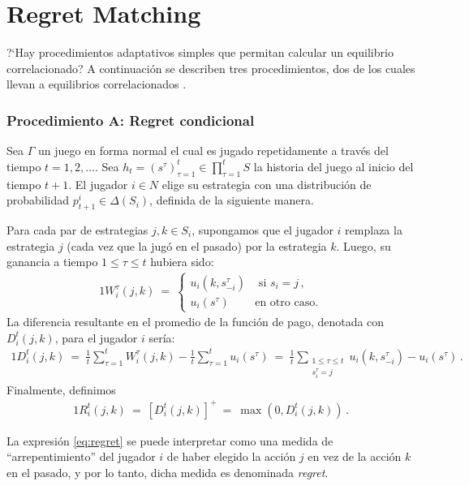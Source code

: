 \chapter{Regret Matching}
?`Hay procedimientos adaptativos simples que permitan calcular un equilibrio correlacionado? A continuación se describen tres procedimientos, dos de los cuales llevan a equilibrios correlacionados \cite{bib:correlated-equilibrium}.

\subsection*{Procedimiento A: Regret condicional}

Sea $\Gamma$ un juego en forma normal el cual es jugado repetidamente a través del tiempo $t = 1, 2, \ldots $. 
Sea $h_t = (s^\tau)_{\tau = 1}^t \in \prod_{\tau = 1}^{t} S$ la historia del juego al inicio del tiempo $t+1$. El jugador $i \in N$ elige su estrategia con una distribución de probabilidad $p_{t+1}^i \in \Delta(S_i)$, definida de la siguiente manera.

Para cada par de estrategias $j, k \in S_i$, supongamos que el jugador $i$ remplaza la estrategia $j$ (cada vez que la jugó en el pasado) por la estrategia $k$. Luego, su ganancia a tiempo $1\leq \tau \leq t$ hubiera sido:
\begin{alignat}{1}
W_i^{\tau}(j,k)\ =\ 
\begin{cases}
u_i(k, s_{-i}^{\tau}) &\text{ si } s_i = j \,, \\
u_i(s^\tau) & \text{en otro caso.} 
\end{cases}
\end{alignat}
La diferencia resultante en el promedio de la función de pago, denotada con $D_i^t(j, k)$, para el jugador $i$ sería:
\begin{alignat}{1}
  D_i^t(j, k)\ 
    =\ \frac{1}{t} \sum_{\tau = 1}^{t} W_i^{\tau}(j, k) - \frac{1}{t} \sum_{\tau = 1}^{t} u_i(s^{\tau})\ 
	=\ \frac{1}{t} \sum_{\substack{1\leq \tau \leq t \\s^\tau_i = j}} u_i(k, s_{-i}^{\tau}) - u_i(s^{\tau}) \,.
\end{alignat}
Finalmente, definimos
\begin{alignat}{1}
\label{eq:regret}
R_i^t(j, k)\ =\ [D_i^t(j, k)]^+\ =\ \max(0, D_i^t(j, k)) \,.
\end{alignat}

La expresión \eqref{eq:regret} se puede interpretar como una medida de ``arrepentimiento'' del jugador $i$ de haber elegido la acción $j$ en vez de la acción $k$ en el pasado, y por lo tanto, dicha medida es denominada \textit{regret}.

